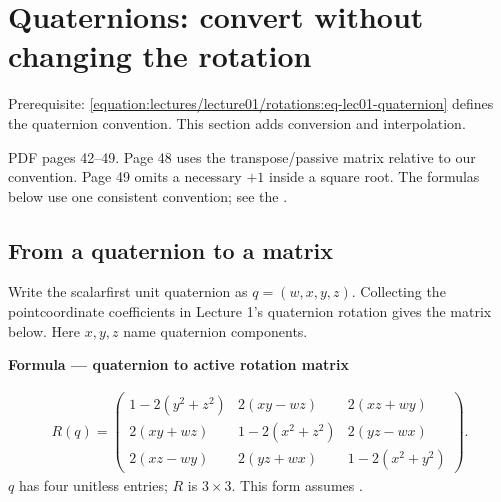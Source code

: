 \documentclass[letterpaper,11pt,english,openany,oneside]{jupyterBook}
\begin{document}
\sphinxstepscope


\section{Quaternions: convert without changing the rotation}
\label{\detokenize{lectures/lecture02/quaternions:quaternions-convert-without-changing-the-rotation}}\label{\detokenize{lectures/lecture02/quaternions:lec02-quaternions}}\label{\detokenize{lectures/lecture02/quaternions::doc}}
\sphinxAtStartPar
Prerequisite: \eqref{equation:lectures/lecture01/rotations:eq-lec01-quaternion} defines the quaternion convention. This section adds conversion and interpolation.

\sphinxAtStartPar
{} PDF pages 42–49. Page 48 uses the transpose/passive matrix relative to our convention. Page 49 omits a necessary \(+1\) inside a square root. The formulas below use one consistent convention; see the {\hyperref[\detokenize{reference/errata:errata}]{}}.


\subsection{From a quaternion to a matrix}
\label{\detokenize{lectures/lecture02/quaternions:from-a-quaternion-to-a-matrix}}
\sphinxAtStartPar
Write the scalar\sphinxhyphen{}first unit quaternion as \(q=(w,x,y,z)\). Collecting the point\sphinxhyphen{}coordinate coefficients in Lecture 1’s quaternion rotation gives the matrix below. Here \(x,y,z\) name quaternion components.

\begin{TextbookBox}
\textbf{Formula — quaternion to active rotation matrix}\par\smallskip
\begin{equation}\label{equation:lectures/lecture02/quaternions:eq-lec02-qmatrix}
\begin{split}R(q)=\begin{pmatrix}
1-2(y^2+z^2)&2(xy-wz)&2(xz+wy)\\
2(xy+wz)&1-2(x^2+z^2)&2(yz-wx)\\
2(xz-wy)&2(yz+wx)&1-2(x^2+y^2)
\end{pmatrix}.\end{split}
\end{equation}
\sphinxAtStartPar
\(q\) has four unitless entries; \(R\) is \(3\times3\). This form assumes .

\end{TextbookBox}
\end{document}
